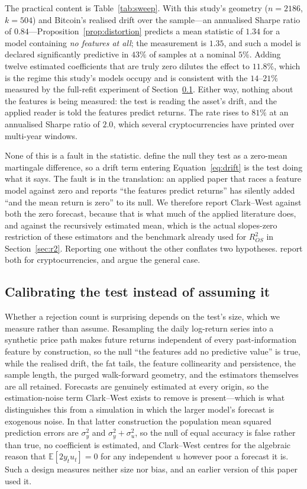 \documentclass{article}
\theoremstyle{plain}
\theoremstyle{definition}
\newcommand{\rsq}{R^2_{OS}}
\begin{document}
The practical content is Table~\ref{tab:sweep}. With this study's geometry
($n=2186$, $k=504$) and Bitcoin's realised drift over the sample---an annualised Sharpe
ratio of $0.84$---Proposition~\ref{prop:distortion} predicts a mean statistic of $1.34$ for
a model containing \emph{no features at all}; the measurement is $1.35$, and such a model is
declared significantly predictive in $43\%$ of samples at a nominal $5\%$. Adding twelve
estimated coefficients that are truly zero dilutes the effect to $11.8\%$, which is the
regime this study's models occupy and is consistent with the $14$--$21\%$ measured by the
full-refit experiment of Section~\ref{sec:calibration}. Either way, nothing about the
features is being measured: the test is reading the asset's drift, and the applied reader is
told the features predict returns. The rate rises to $81\%$ at an annualised Sharpe ratio of
$2.0$, which several cryptocurrencies have printed over multi-year windows.

None of this is a fault in the statistic. \citet{clark2006} define the null they
test as a zero-mean martingale difference, so a drift term entering
Equation~\eqref{eq:drift} is the test doing what it says. The fault is in the
translation: an applied paper that races a feature model against zero and reports
``the features predict returns'' has silently added ``and the mean return is
zero'' to its null. We therefore report Clark--West against both the zero forecast,
because that is what much of the applied literature does, and against the
recursively estimated mean, which is the actual slopes-zero restriction of these
estimators and the benchmark already used for $\rsq$ in Section~\ref{sec:r2}.
Reporting one without the other conflates two hypotheses. \citet{magner2022} report
both for cryptocurrencies, and \citet{moosa2016} argue the general case.

\subsection{Calibrating the test instead of assuming it}
\label{sec:calibration}

Whether a rejection count is surprising depends on the test's size, which we
measure rather than assume. Resampling the daily log-return series into a synthetic
price path makes future returns independent of every past-information feature by
construction, so the null ``the features add no predictive value'' is true, while
the realised drift, the fat tails, the feature collinearity and persistence, the
sample length, the purged walk-forward geometry, and the estimators themselves are
all retained. Forecasts are genuinely estimated at every origin, so the
estimation-noise term Clark--West exists to remove is present---which is what
distinguishes this from a simulation in which the larger model's forecast is
exogenous noise. In that latter construction the population mean squared prediction
errors are $\sigma_y^2$ and $\sigma_y^2 + \sigma_u^2$, so the null of equal
accuracy is false rather than true, no coefficient is estimated, and Clark--West
centres for the algebraic reason that $\mathbb{E}[2 y_t u_t] = 0$ for any
independent $u$ however poor a forecast it is. Such a design measures neither
size nor bias, and an earlier version of this paper used it.
\end{document}
